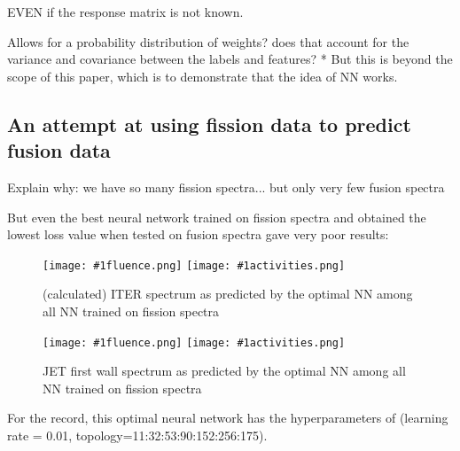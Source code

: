 \documentclass[a4paper, 12pt]{article}
\newcommand{\fluenceandactivities}[1]{
\texttt{[image: \#1fluence.png]}
\texttt{[image: \#1activities.png]}
}
\begin{document}
EVEN if the response matrix is not known.

Allows for a probability distribution of weights? does that account for the variance and covariance between the labels and features? *
But this is beyond the scope of this paper, which is to demonstrate that the idea of NN works.

\subsection{An attempt at using fission data to predict fusion data}
Explain why: we have so many fission spectra... but only very few fusion spectra

But even the best neural network trained on fission spectra and obtained the lowest loss value when tested on fusion spectra gave very poor results:
\begin{figure}
\centering
\fluenceandactivities{/home/ocean/Documents/GitHubDir/unfolding/unfolding/unfoldingsuite/neuralnetwork/realoutputEarlyStopping/SelectedNNreplicated/fission-fusion/0918_0325_5_layer_test_mse_1_test_007_}
\caption{(calculated) ITER spectrum as predicted by the optimal NN among all NN trained on fission spectra} \label{fission-fusionBad}
\end{figure}

\begin{figure}
\centering
\fluenceandactivities{/home/ocean/Documents/GitHubDir/unfolding/unfolding/unfoldingsuite/neuralnetwork/realoutputEarlyStopping/SelectedNNreplicated/fission-fusion/0918_0325_5_layer_test_mse_1_test_016_}
\caption{JET first wall spectrum as predicted by the optimal NN among all NN trained on fission spectra}\label{fission-fusionGood}
\end{figure}

For the record, this optimal neural network has the hyperparameters of (learning rate = 0.01, topology=11:32:53:90:152:256:175).
\end{document}
